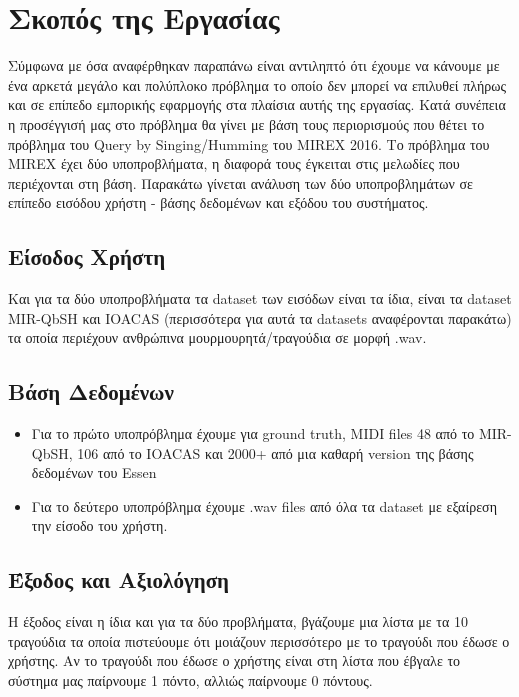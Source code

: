 \section{Σκοπός της Εργασίας}
Σύμφωνα με όσα αναφέρθηκαν παραπάνω είναι αντιληπτό ότι έχουμε να κάνουμε με
ένα αρκετά μεγάλο και πολύπλοκο πρόβλημα το οποίο δεν μπορεί να επιλυθεί πλήρως
και σε επίπεδο εμπορικής εφαρμογής στα πλαίσια αυτής της εργασίας. Κατά συνέπεια
η προσέγγισή μας στο πρόβλημα θα γίνει με βάση τους περιορισμούς που θέτει το
πρόβλημα του Query by Singing/Humming του MIREX 2016\cite{mirex}. Το πρόβλημα
του MIREX έχει δύο υποπροβλήματα, η διαφορά τους έγκειται στις μελωδίες που
περιέχονται στη βάση. Παρακάτω γίνεται ανάλυση των δύο υποπροβλημάτων σε
επίπεδο εισόδου χρήστη - βάσης δεδομένων και εξόδου του συστήματος.

\subsection{Είσοδος Χρήστη}
Και για τα δύο υποπροβλήματα τα dataset των εισόδων είναι τα ίδια, είναι τα
dataset MIR-QbSH και IOACAS (περισσότερα για αυτά τα datasets αναφέρονται
παρακάτω) τα οποία περιέχουν ανθρώπινα μουρμουρητά/τραγούδια σε μορφή .wav.

\subsection{Βάση Δεδομένων}
\begin{itemize}
  \item Για το πρώτο υποπρόβλημα έχουμε για ground truth, MIDI files 48 από το
  MIR-QbSH, 106 από το IOACAS και 2000+ από μια καθαρή version της βάσης
  δεδομένων του Essen \cite{esac-dataset}
  \item Για το δεύτερο υποπρόβλημα έχουμε .wav files από όλα τα dataset με
  εξαίρεση την είσοδο του χρήστη.
\end{itemize}


\subsection{Έξοδος και Αξιολόγηση}
Η έξοδος είναι η ίδια και για τα δύο προβλήματα, βγάζουμε μια λίστα με τα 10
τραγούδια τα οποία πιστεύουμε ότι μοιάζουν περισσότερο με το τραγούδι που έδωσε
ο χρήστης. Αν το τραγούδι που έδωσε ο χρήστης είναι στη λίστα που έβγαλε το
σύστημα μας παίρνουμε 1 πόντο, αλλιώς παίρνουμε 0 πόντους.
